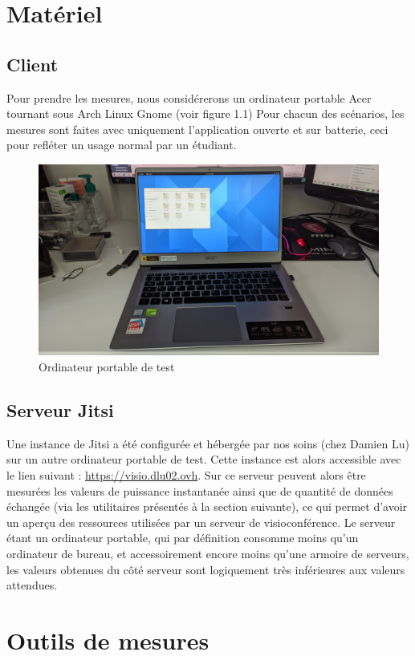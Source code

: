 \documentclass[11pt,a4paper]{report}
\begin{document}
\section{Matériel}
\subsection{Client}
Pour prendre les mesures, nous considérerons un ordinateur portable Acer tournant sous Arch Linux Gnome (voir figure 1.1) Pour chacun des scénarios, les mesures sont faites avec uniquement l'application ouverte et sur batterie, ceci pour refléter un usage normal par un étudiant.
\begin{figure}[!h]
    \centering
    \includegraphics[scale=0.1]{ordinateur.jpg}
    \caption{Ordinateur portable de test}
\end{figure}
\subsection{Serveur Jitsi}
Une instance de Jitsi a été configurée et hébergée par nos soins (chez Damien Lu) sur un autre ordinateur portable de test. Cette instance est alors accessible avec le lien suivant : \url{https://visio.dlu02.ovh}. Sur ce serveur peuvent alors être mesurées les valeurs de puissance instantanée ainsi que de quantité de données échangée (via les utilitaires présentés à la section suivante), ce qui permet d'avoir un aperçu des ressources utilisées par un serveur de visioconférence. 
\br Le serveur étant un ordinateur portable, qui par définition consomme moins qu'un ordinateur de bureau, et accessoirement encore moins qu'une armoire de serveurs, les valeurs obtenues du côté serveur sont logiquement très inférieures aux valeurs attendues. \eb
\section{Outils de mesures}
\end{document}
